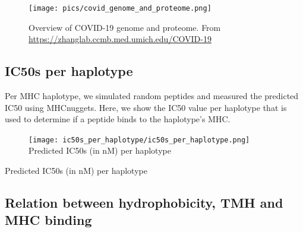 \begin{figure}[!htbp]
  \texttt{[image: pics/covid\_genome\_and\_proteome.png]}
  \caption{
    Overview of COVID-19 genome and proteome.
    From 
    \url{https://zhanglab.ccmb.med.umich.edu/COVID-19}
  }
  \label{fig:covid_genome_and_proteome}
\end{figure}

\subsection{IC50s per haplotype}

Per MHC haplotype, we simulated random peptides and measured the
predicted IC50 using MHCnuggets. 
Here, we show the IC50 value per haplotype that
is used to determine if a peptide binds to the haplotype's MHC.

\begin{figure}[!htbp]
  \texttt{[image: ic50s\_per\_haplotype/ic50s\_per\_haplotype.png]}
  Predicted IC50s (in nM) per haplotype
  \caption{
  }
  \label{fig:ic50s_per_haplotype}
\end{figure}


\begin{table}[!htbp]
  
  \caption{
    Predicted IC50s (in nM) per haplotype
  }
  \label{table:ic50s_per_haplotype}
\end{table}

\subsection{Relation between hydrophobicity, TMH and MHC binding}

